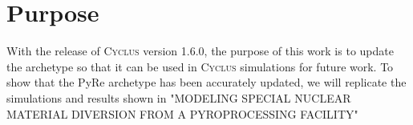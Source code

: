 \documentclass{anstrans}
\newcommand{\cyclus}{\textsc{Cyclus}\xspace}
\begin{document}
\section{Purpose}

With the release of \cyclus version 1.6.0, the purpose of this work is to update the archetype so that it can be used in \cyclus simulations for future work. To show that the PyRe archetype has been accurately updated, we will replicate the simulations and results shown in "MODELING SPECIAL NUCLEAR MATERIAL DIVERSION FROM A PYROPROCESSING FACILITY"




\end{document}
